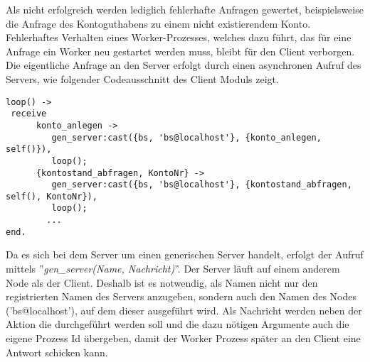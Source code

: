 Als nicht erfolgreich werden lediglich fehlerhafte Anfragen gewertet, beispielsweise die Anfrage des Kontoguthabens zu einem nicht existierendem Konto. Fehlerhaftes Verhalten eines Worker-Prozesses, welches dazu führt, das für eine Anfrage ein Worker neu gestartet werden muss, bleibt für den Client verborgen.\\
Die eigentliche Anfrage an den Server erfolgt durch einen asynchronen Aufruf des Servers, wie folgender Codeausschnitt des Client Moduls zeigt.
\begin{lstlisting} 
loop() ->
 receive
      konto_anlegen ->
         gen_server:cast({bs, 'bs@localhost'}, {konto_anlegen, self()}),
         loop();
      {kontostand_abfragen, KontoNr} ->
         gen_server:cast({bs, 'bs@localhost'}, {kontostand_abfragen, self(), KontoNr}),
         loop();
		...
end.
\end{lstlisting}
Da es sich bei dem Server um einen generischen Server handelt, erfolgt der Aufruf mittels ''\textit{gen\_server(Name, Nachricht)}''. Der Server läuft auf einem anderem Node als der Client. Deshalb ist es notwendig, als Namen nicht nur den registrierten Namen des Servers anzugeben, sondern auch den Namen des Nodes ('bs@localhost'), auf dem dieser ausgeführt wird. Als Nachricht werden neben der Aktion die durchgeführt werden soll und die dazu nötigen Argumente auch die eigene Prozess Id übergeben, damit der Worker Prozess später an den Client eine Antwort schicken kann.
